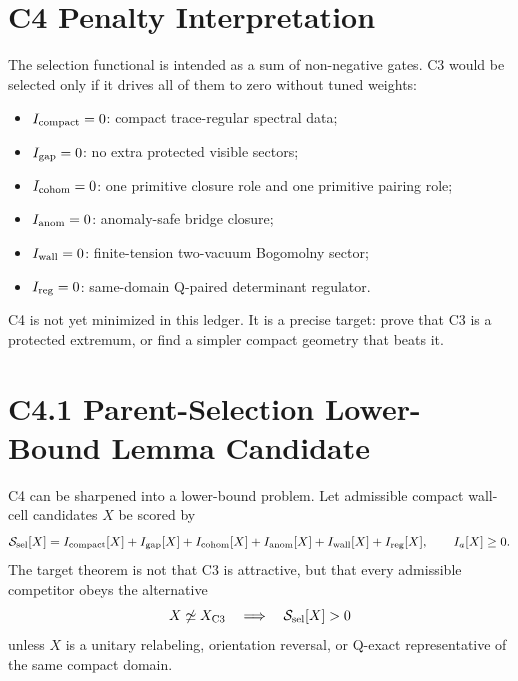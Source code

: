 \documentclass[11pt]{article}
\begin{document}
\section{C4 Penalty Interpretation}
The selection functional is intended as a sum of non-negative gates.  C3 would
be selected only if it drives all of them to zero without tuned weights:
\begin{itemize}
\item $I_{\rm compact}=0$: compact trace-regular spectral data;
\item $I_{\rm gap}=0$: no extra protected visible sectors;
\item $I_{\rm cohom}=0$: one primitive closure role and one primitive pairing role;
\item $I_{\rm anom}=0$: anomaly-safe bridge closure;
\item $I_{\rm wall}=0$: finite-tension two-vacuum Bogomolny sector;
\item $I_{\rm reg}=0$: same-domain Q-paired determinant regulator.
\end{itemize}
C4 is not yet minimized in this ledger.  It is a precise target: prove that C3
is a protected extremum, or find a simpler compact geometry that beats it.

\section{C4.1 Parent-Selection Lower-Bound Lemma Candidate}
C4 can be sharpened into a lower-bound problem.  Let admissible compact
wall-cell candidates $X$ be scored by
\begin{equation}
{\cal S}_{\rm sel}[X]=
I_{\rm compact}[X]+I_{\rm gap}[X]+I_{\rm cohom}[X]+I_{\rm anom}[X]
+I_{\rm wall}[X]+I_{\rm reg}[X],
\qquad I_a[X]\geq 0 .
\end{equation}
The target theorem is not that C3 is attractive, but that every admissible
competitor obeys the alternative
\begin{equation}
X\not\simeq X_{\rm C3}
\quad\Longrightarrow\quad
{\cal S}_{\rm sel}[X]>0
\end{equation}
unless $X$ is a unitary relabeling, orientation reversal, or Q-exact
representative of the same compact domain.
\end{document}

